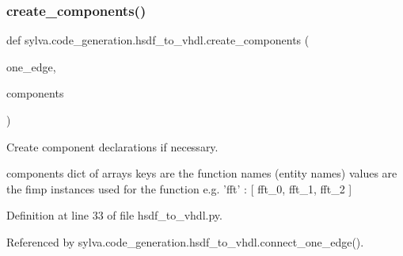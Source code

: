 \subsubsection{\texorpdfstring{create\+\_\+components()}{create\_components()}}
{\footnotesize\ttfamily def sylva.\+code\+\_\+generation.\+hsdf\+\_\+to\+\_\+vhdl.\+create\+\_\+components (\begin{DoxyParamCaption}\item[{}]{one\+\_\+edge,  }\item[{}]{components }\end{DoxyParamCaption})}

\begin{DoxyVerb}Create component declarations if necessary.

  components
    dict of arrays
    keys are the function names (entity names)
    values are the fimp instances used for the function
    e.g. {'fft' : [ fft_0, fft_1, fft_2 ]}
\end{DoxyVerb}
 

Definition at line 33 of file hsdf\+\_\+to\+\_\+vhdl.\+py.



Referenced by sylva.\+code\+\_\+generation.\+hsdf\+\_\+to\+\_\+vhdl.\+connect\+\_\+one\+\_\+edge().


